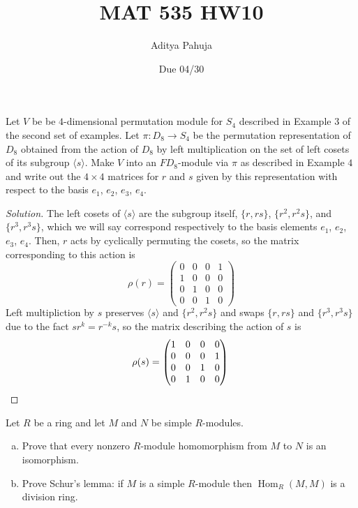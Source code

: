 \documentclass[10pt]{article}
\title{MAT 535 HW10}
\author{\large Aditya Pahuja}
\date{\large Due 04/30}
\renewcommand{\hom}{\operatorname{Hom}}
\providecommand{\ii}{\item}
\newenvironment{soln}{\begin{proof}[Solution]}{\end{proof}}
\begin{document}
\maketitle

\begin{problem}
    [\S18.1\#7]
    Let $V$ be be $4$-dimensional permutation module for $S_4$
    described in Example $3$ of the second set of examples.
    Let $\pi\colon D_8\to S_4$ be the permutation representation of $D_8$
    obtained from the action of $D_8$ by
    left multiplication on the set of left cosets of its subgroup
    $\langle s\rangle$. Make $V$ into an $FD_8$-module via $\pi$
    as described in Example $4$ and write out the $4\times 4$ matrices
    for $r$ and $s$ given by this representation
    with respect to the basis $e_1$, $e_2$, $e_3$, $e_4$.
\end{problem}

\begin{soln}
    The left cosets of $\langle s\rangle$ are the subgroup itself,
    $\{r,rs\}$, $\{r^2,r^2s\}$, and $\{r^3,r^3s\}$,
    which we will say correspond respectively to
    the basis elements $e_1$, $e_2$, $e_3$, $e_4$.
    Then, $r$ acts by cyclically permuting the cosets, so
    the matrix corresponding to this action is
    \begin{equation*}
        \rho(r) = \begin{pmatrix}
	    0&0&0&1\\
	    1&0&0&0\\
	    0&1&0&0\\
	    0&0&1&0
        \end{pmatrix}
    \end{equation*}
    Left multipliction by $s$ preserves $\langle s\rangle$ and $\{r^2, r^2s\}$
    and swaps $\{r,rs\}$ and $\{r^3, r^3s\}$ due to the fact $sr^k = r^{-k}s$,
    so the matrix describing the action of $s$ is
    \begin{equation*}
        \rho(s) = \begin{pmatrix}
	    1&0&0&0\\
	    0&0&0&1\\
	    0&0&1&0\\
	    0&1&0&0\\
        \end{pmatrix}\qedhere
    \end{equation*}
\end{soln}

\begin{problem}
    [\S18.1\#13]
    Let $R$ be a ring and let $M$ and $N$ be simple $R$-modules.
    \begin{enumerate}[(a)]
        \ii Prove that every nonzero $R$-module homomorphism
	from $M$ to $N$ is an isomorphism.
	\ii Prove Schur's lemma: if $M$ is a simple $R$-module
	then $\hom_R(M,M)$ is a division ring.
    \end{enumerate}
\end{problem}
\end{document}
